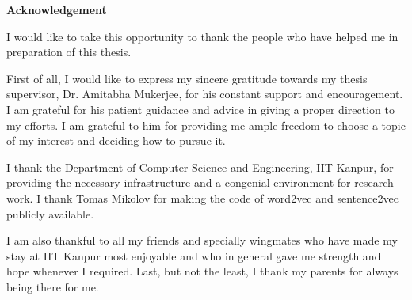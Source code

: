 \cleardoublepage

\begin{center}
	{\huge{\textbf{Acknowledgement}}}
\end{center}

I would like to take this opportunity to thank the people who have helped me in preparation of this thesis.

First of all, I would like to express my sincere gratitude towards my thesis supervisor, Dr. Amitabha Mukerjee, for his  constant support and encouragement. I am grateful for his patient guidance and advice in giving a proper direction to my efforts. I am grateful to him for providing me ample freedom to choose a topic of my interest and deciding how to pursue it.

I thank the Department of Computer Science and Engineering, IIT Kanpur, for providing the necessary infrastructure and a congenial environment for research work. I thank Tomas Mikolov for making the code of word2vec and sentence2vec publicly available.

I am also thankful to all my friends and specially wingmates who have made my stay at IIT Kanpur most enjoyable and who in general gave me strength and hope whenever I required.
Last, but not the least, I thank my parents for always being there for me.

\vskip 4mm
\begin{flushright}
\textit{\textbf{\author}}
\end{flushright}
